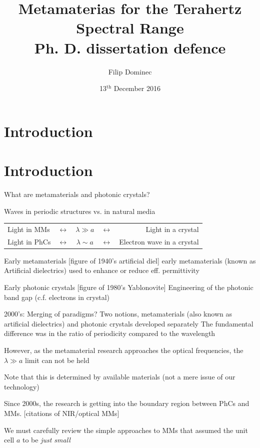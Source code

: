 \documentclass[t]{beamer} \usepackage[czech]{babel} \usepackage[utf8]{inputenc} \usetheme{Frankfurt} %
\title[THz MMs]{Metamaterias for the Terahertz Spectral Range\\ Ph. D. dissertation defence}
\author{Filip Dominec}
\institute{Advisor: Mgr. Filip Kadlec, Dr. (Institute of Physics ASCR)\\ Consultant: Doc. Ing. Ivan Richter, Dr. (FNSPE CTU)}
\date{13$^{\mathrm{th}}$ December 2016}
\begin{document}
\section{Introduction}

\begin{frame}		%
	\titlepage
\end{frame}		%
\section{Introduction}

\begin{frame}{What are metamaterials and photonic crystals?}	%

\begin{exampleblock}{Waves in periodic structures vs. in natural media}
\centering \begin{tabular}{lcccr}
Light in MMs    &$\leftrightarrow$  &$\lambda \gg a$ &$\leftrightarrow$ 	& Light in a crystal         	\\
Light in PhCs   &$\leftrightarrow$  &$\lambda \sim a$ &$\leftrightarrow$ 	& Electron wave in a crystal 	\\
\end{tabular}
\end{exampleblock}


\end{frame} 		%


\begin{frame}{Early metamaterials} 		%
[figure of 1940's artificial diel] early metamaterials (known as Artificial dielectrics) used to enhance or reduce eff. permittivity 
\end{frame} 		%

\begin{frame}{Early photonic crystals} 		%
[figure of 1980's Yablonovite]    
Engineering of the photonic band gap (c.f. electrons in crystal)
\end{frame} 		%

\begin{frame}{2000's: Merging of paradigms?} 		%
Two notions, metamaterials (also known as artificial dielectrics) and photonic crystals developed separately
The fundamental difference was in the ratio of periodicity compared to the wavelength

However, as the metamaterial research approaches the optical frequencies,  the $\lambda \gg a$ limit can not be held

Note that this is determined by available materials (not a mere issue of our technology)

Since 2000s, the research is getting into the boundary region between PhCs and MMs. [citations of NIR/optical MMs] 

We must carefully review the simple approaches to MMs that assumed the unit cell $a$ to be \textit{just small}
\end{frame} 		%
\end{document}
